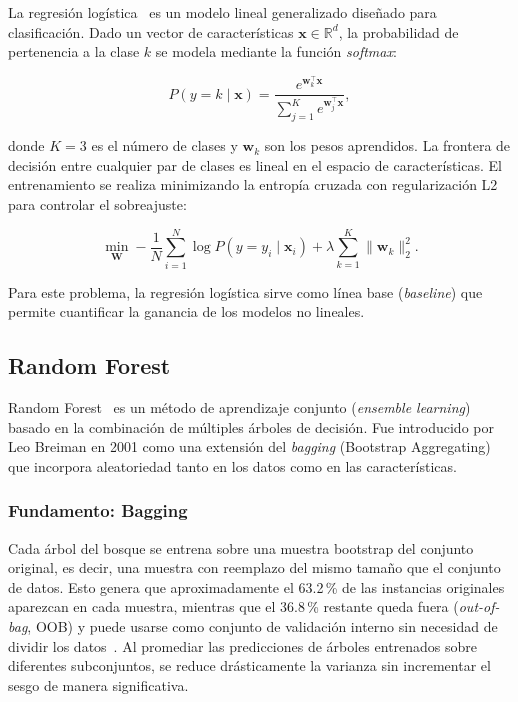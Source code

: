 \documentclass[conference]{IEEEtran}
\begin{document}
La regresión logística~\cite{hosmer2013applied} es un modelo lineal generalizado diseñado para clasificación. Dado un vector de características \(\mathbf{x} \in \mathbb{R}^d\), la probabilidad de pertenencia a la clase \(k\) se modela mediante la función \emph{softmax}:

\[
P(y=k \mid \mathbf{x}) = \frac{e^{\mathbf{w}_k^\top \mathbf{x}}}{\sum_{j=1}^{K} e^{\mathbf{w}_j^\top \mathbf{x}}},
\]

donde \(K=3\) es el número de clases y \(\mathbf{w}_k\) son los pesos aprendidos. La frontera de decisión entre cualquier par de clases es lineal en el espacio de características. El entrenamiento se realiza minimizando la entropía cruzada con regularización L2 para controlar el sobreajuste:

\[
\min_{\mathbf{W}} -\frac{1}{N}\sum_{i=1}^{N} \log P(y=y_i \mid \mathbf{x}_i) + \lambda \sum_{k=1}^{K} \|\mathbf{w}_k\|_2^2.
\]

Para este problema, la regresión logística sirve como línea base (\emph{baseline}) que permite cuantificar la ganancia de los modelos no lineales.

\subsection{Random Forest}
Random Forest~\cite{breiman2001random} es un método de aprendizaje conjunto (\emph{ensemble learning}) basado en la combinación de múltiples árboles de decisión. Fue introducido por Leo Breiman en 2001 como una extensión del \emph{bagging} (Bootstrap Aggregating) que incorpora aleatoriedad tanto en los datos como en las características.

\subsubsection*{Fundamento: Bagging}
Cada árbol del bosque se entrena sobre una muestra bootstrap del conjunto original, es decir, una muestra con reemplazo del mismo tamaño que el conjunto de datos. Esto genera que aproximadamente el 63.2\,\% de las instancias originales aparezcan en cada muestra, mientras que el 36.8\,\% restante queda fuera (\emph{out-of-bag}, OOB) y puede usarse como conjunto de validación interno sin necesidad de dividir los datos~\cite{breiman1996bagging}. Al promediar las predicciones de árboles entrenados sobre diferentes subconjuntos, se reduce drásticamente la varianza sin incrementar el sesgo de manera significativa.
\end{document}
